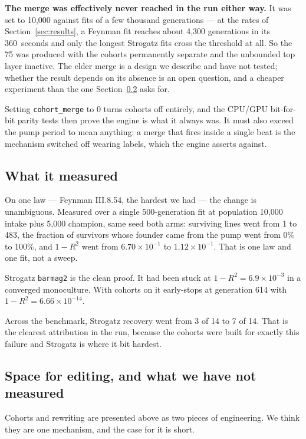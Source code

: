 \documentclass[11pt,a4paper]{article}
\begin{document}
\textbf{The merge was effectively never reached in the run either way.} It was
set to 10{,}000 against fits of a few thousand generations --- at the rates of
Section~\ref{sec:results}, a Feynman fit reaches about 4{,}300 generations in its
360~seconds and only the longest Strogatz fits cross the threshold at all. So the
75 was produced with the cohorts permanently separate and the unbounded top layer
inactive. The elder merge is a design we describe and have not tested; whether
the result depends on its absence is an open question, and a cheaper experiment
than the one Section~\ref{sec:together} asks for.

Setting \texttt{cohort\_merge} to 0 turns cohorts off entirely, and the CPU/GPU
bit-for-bit parity tests then prove the engine is what it always was. It must
also exceed the pump period to mean anything: a merge that fires inside a single
beat is the mechanism switched off wearing labels, which the engine asserts
against.

\subsection{What it measured}
\label{sec:measured}

On one law --- Feynman III.8.54, the hardest we had --- the change is
unambiguous. Measured over a single 500-generation fit at population 10{,}000
intake plus 5{,}000 champion, same seed both arms: surviving lines went from 1
to 483, the fraction of survivors whose founder came from the pump went from
0\% to 100\%, and $1 - R^2$ went from $6.70\times10^{-1}$ to
$1.12\times10^{-1}$. That is one law and one fit, not a sweep.

Strogatz \texttt{barmag2} is the clean proof. It had been stuck at $1 - R^2 =
6.9\times10^{-3}$ in a converged monoculture. With cohorts on it early-stops at
generation 614 with $1 - R^2 = 6.66\times10^{-14}$.

Across the benchmark, Strogatz recovery went from 3 of 14 to 7 of 14. That is
the clearest attribution in the run, because the cohorts were built for exactly
this failure and Strogatz is where it bit hardest.

\subsection{Space for editing, and what we have not measured}
\label{sec:together}

Cohorts and rewriting are presented above as two pieces of engineering. We think
they are one mechanism, and the case for it is short.
\end{document}
